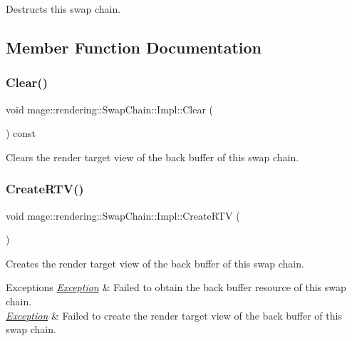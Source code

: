 Destructs this swap chain. 

\subsection{Member Function Documentation}
\hypertarget{classmage_1_1rendering_1_1_swap_chain_1_1_impl_ab48d24a25bd342f6a3882426e333a716}{}\label{classmage_1_1rendering_1_1_swap_chain_1_1_impl_ab48d24a25bd342f6a3882426e333a716} 
\subsubsection{\texorpdfstring{Clear()}{Clear()}}
{\footnotesize\ttfamily void mage\+::rendering\+::\+Swap\+Chain\+::\+Impl\+::\+Clear (\begin{DoxyParamCaption}{ }\end{DoxyParamCaption}) const\hspace{0.3cm}{\ttfamily [noexcept]}}

Clears the render target view of the back buffer of this swap chain. \hypertarget{classmage_1_1rendering_1_1_swap_chain_1_1_impl_a414e0c397b0c00a893b92845b6918ffc}{}\label{classmage_1_1rendering_1_1_swap_chain_1_1_impl_a414e0c397b0c00a893b92845b6918ffc} 
\subsubsection{\texorpdfstring{Create\+R\+T\+V()}{CreateRTV()}}
{\footnotesize\ttfamily void mage\+::rendering\+::\+Swap\+Chain\+::\+Impl\+::\+Create\+R\+TV (\begin{DoxyParamCaption}{ }\end{DoxyParamCaption})\hspace{0.3cm}{\ttfamily [private]}}

Creates the render target view of the back buffer of this swap chain.


\begin{DoxyExceptions}{Exceptions}
{\em \hyperlink{classmage_1_1_exception}{Exception}} & Failed to obtain the back buffer resource of this swap chain. \\
\hline
{\em \hyperlink{classmage_1_1_exception}{Exception}} & Failed to create the render target view of the back buffer of this swap chain. \\
\hline
\end{DoxyExceptions}
\hypertarget{classmage_1_1rendering_1_1_swap_chain_1_1_impl_a990a602cf4639daa85210b4cbd1e525e}{}\label{classmage_1_1rendering_1_1_swap_chain_1_1_impl_a990a602cf4639daa85210b4cbd1e525e} 
